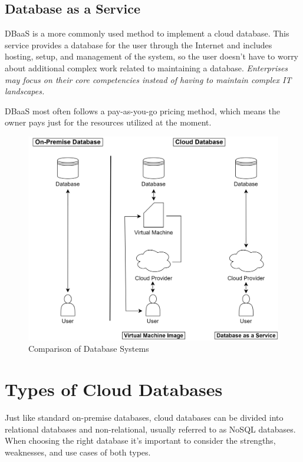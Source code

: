 \documentclass[12pt, a4paper]{article}
\begin{document}
    \subsection{Database as a Service}
        DBaaS is a more commonly used method to implement a cloud database. This service provides a database for the user through the Internet and includes hosting, setup, and management of the system, so the user doesn't have to worry about additional complex work related to maintaining a database. \textit{Enterprises may focus on their core competencies instead of having to maintain complex IT landscapes.}\cite{11}\par DBaaS most often follows a pay-as-you-go pricing method, which means the owner pays just for the resources utilized at the moment.
        \begin{figure}[b]
            \centering
            \includegraphics[width=1\linewidth]{images/onpremise-cloud.png}
            \caption{Comparison of Database Systems}
            \label{fig:comparison}
        \end{figure}
\clearpage

\section{Types of Cloud Databases}
    Just like standard on-premise databases, cloud databases can be divided into relational databases and non-relational, usually referred to as NoSQL databases. When choosing the right database it's important to consider the strengths, weaknesses, and use cases of both types.
\end{document}
